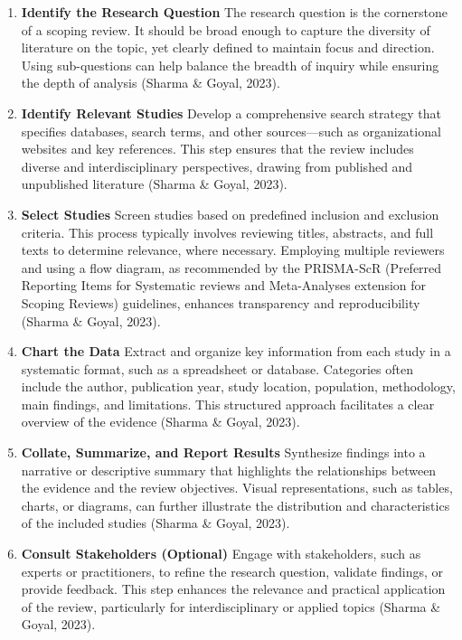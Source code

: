 \documentclass[
  letterpaper,
  DIV=11,
  numbers=noendperiod]{scrreprt}
\providecommand{\tightlist}{%
  \setlength{\itemsep}{0pt}\setlength{\parskip}{0pt}}\usepackage{longtable,booktabs,array}
\begin{document}
\begin{enumerate}
\def\labelenumi{\arabic{enumi}.}
\tightlist
\item
  \textbf{Identify the Research Question} The research question is the
  cornerstone of a scoping review. It should be broad enough to capture
  the diversity of literature on the topic, yet clearly defined to
  maintain focus and direction. Using sub-questions can help balance the
  breadth of inquiry while ensuring the depth of analysis (Sharma \&
  Goyal, 2023).
\item
  \textbf{Identify Relevant Studies} Develop a comprehensive search
  strategy that specifies databases, search terms, and other
  sources---such as organizational websites and key references. This
  step ensures that the review includes diverse and interdisciplinary
  perspectives, drawing from published and unpublished literature
  (Sharma \& Goyal, 2023).
\item
  \textbf{Select Studies} Screen studies based on predefined inclusion
  and exclusion criteria. This process typically involves reviewing
  titles, abstracts, and full texts to determine relevance, where
  necessary. Employing multiple reviewers and using a flow diagram, as
  recommended by the PRISMA-ScR (Preferred Reporting Items for
  Systematic reviews and Meta-Analyses extension for Scoping Reviews)
  guidelines, enhances transparency and reproducibility (Sharma \&
  Goyal, 2023).
\item
  \textbf{Chart the Data} Extract and organize key information from each
  study in a systematic format, such as a spreadsheet or database.
  Categories often include the author, publication year, study location,
  population, methodology, main findings, and limitations. This
  structured approach facilitates a clear overview of the evidence
  (Sharma \& Goyal, 2023).
\item
  \textbf{Collate, Summarize, and Report Results} Synthesize findings
  into a narrative or descriptive summary that highlights the
  relationships between the evidence and the review objectives. Visual
  representations, such as tables, charts, or diagrams, can further
  illustrate the distribution and characteristics of the included
  studies (Sharma \& Goyal, 2023).
\item
  \textbf{Consult Stakeholders (Optional)} Engage with stakeholders,
  such as experts or practitioners, to refine the research question,
  validate findings, or provide feedback. This step enhances the
  relevance and practical application of the review, particularly for
  interdisciplinary or applied topics (Sharma \& Goyal, 2023).
\end{enumerate}
\end{document}
